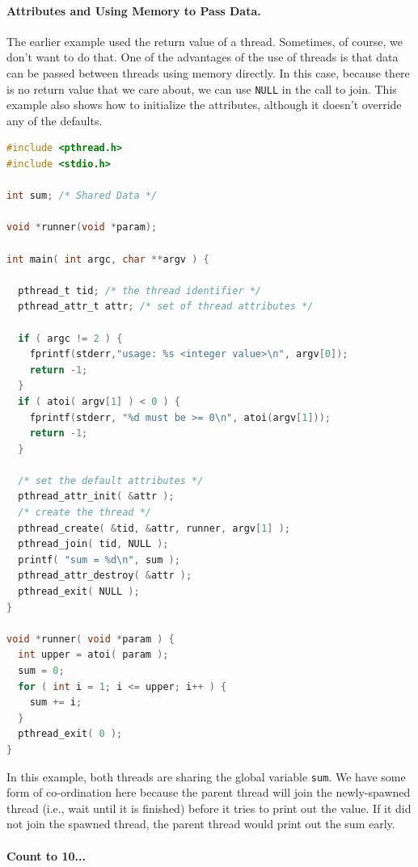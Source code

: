 \paragraph{Attributes and Using Memory to Pass Data.}
The earlier example used the return value of a thread. Sometimes, of course, we don't want to do that. One of the advantages of the use of threads is that data can be passed between threads using memory directly. In this case, because there is no return value that we care about, we can use \texttt{NULL} in the call to join. This example also shows how to initialize the attributes, although it doesn't override any of the defaults.


\begin{lstlisting}[language=C]
#include <pthread.h>
#include <stdio.h>

int sum; /* Shared Data */

void *runner(void *param);

int main( int argc, char **argv ) {

  pthread_t tid; /* the thread identifier */
  pthread_attr_t attr; /* set of thread attributes */

  if ( argc != 2 ) {
    fprintf(stderr,"usage: %s <integer value>\n", argv[0]);
    return -1;
  }
  if ( atoi( argv[1] ) < 0 ) {
    fprintf(stderr, "%d must be >= 0\n", atoi(argv[1]));
    return -1;
  }

  /* set the default attributes */
  pthread_attr_init( &attr );
  /* create the thread */
  pthread_create( &tid, &attr, runner, argv[1] );
  pthread_join( tid, NULL );
  printf( "sum = %d\n", sum );
  pthread_attr_destroy( &attr );
  pthread_exit( NULL );
}

void *runner( void *param ) {
  int upper = atoi( param );
  sum = 0;
  for ( int i = 1; i <= upper; i++ ) {
    sum += i;
  }
  pthread_exit( 0 );
}
\end{lstlisting}

In this example, both threads are sharing the global variable \texttt{sum}. We have some form of co-ordination here because the parent thread will join the newly-spawned thread (i.e., wait until it is finished) before it tries to print out the value. If it did not join the spawned thread, the parent thread would print out the sum early.



\paragraph{Count to 10...}

